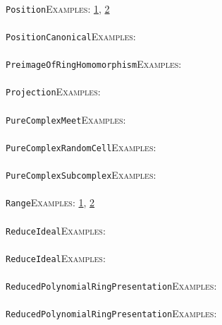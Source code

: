 \documentclass[a4paper,11pt]{report}
\begin{document}
{{ \\
 \texttt{Position}{\nobreakspace}{\nobreakspace}{\nobreakspace}{\nobreakspace}\textsc{Examples:} \href{tutorial/chap4.html} {1}{\nobreakspace}, \href{../www/SideLinks/About/aboutTensorSquare.html} {2}{\nobreakspace} \\
 \\
 \texttt{PositionCanonical}{\nobreakspace}{\nobreakspace}{\nobreakspace}{\nobreakspace}\textsc{Examples:} \\
 \\
 \texttt{PreimageOfRingHomomorphism}{\nobreakspace}{\nobreakspace}{\nobreakspace}{\nobreakspace}\textsc{Examples:} \\
 \\
 \texttt{Projection}{\nobreakspace}{\nobreakspace}{\nobreakspace}{\nobreakspace}\textsc{Examples:} \\
 \\
 \texttt{PureComplexMeet}{\nobreakspace}{\nobreakspace}{\nobreakspace}{\nobreakspace}\textsc{Examples:} \\
 \\
 \texttt{PureComplexRandomCell}{\nobreakspace}{\nobreakspace}{\nobreakspace}{\nobreakspace}\textsc{Examples:} \\
 \\
 \texttt{PureComplexSubcomplex}{\nobreakspace}{\nobreakspace}{\nobreakspace}{\nobreakspace}\textsc{Examples:} \\
 \\
 \texttt{Range}{\nobreakspace}{\nobreakspace}{\nobreakspace}{\nobreakspace}\textsc{Examples:} \href{tutorial/chap10.html} {1}{\nobreakspace}, \href{../www/SideLinks/About/aboutTensorSquare.html} {2}{\nobreakspace} \\
 \\
 \texttt{ReduceIdeal}{\nobreakspace}{\nobreakspace}{\nobreakspace}{\nobreakspace}\textsc{Examples:} \\
 \\
 \texttt{ReduceIdeal}{\nobreakspace}{\nobreakspace}{\nobreakspace}{\nobreakspace}\textsc{Examples:} \\
 \\
 \texttt{ReducedPolynomialRingPresentation}{\nobreakspace}{\nobreakspace}{\nobreakspace}{\nobreakspace}\textsc{Examples:} \\
 \\
 \texttt{ReducedPolynomialRingPresentation}{\nobreakspace}{\nobreakspace}{\nobreakspace}{\nobreakspace}\textsc{Examples:} \\
 \\
}}
\end{document}
